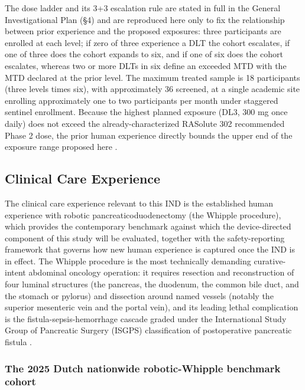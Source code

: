 The dose ladder and its 3+3 escalation rule are stated in full in the General
Investigational Plan (\S 4) and are reproduced here only to fix the relationship
between prior experience and the proposed exposures: three participants are enrolled
at each level; if zero of three experience a DLT the cohort escalates, if one of
three does the cohort expands to six, and if one of six does the cohort escalates,
whereas two or more DLTs in six define an exceeded MTD with the MTD declared at the
prior level. The maximum treated sample is 18 participants (three levels times six),
with approximately 36 screened, at a single academic site enrolling approximately
one to two participants per month under staggered sentinel enrollment. Because the
highest planned exposure (DL3, 300 mg once daily) does not exceed the
already-characterized RASolute 302 recommended Phase 2 dose, the prior human
experience directly bounds the upper end of the exposure range proposed here
\cite{daraxwhipple, phase1guidance}.

\subsection{Clinical Care Experience}

The clinical care experience relevant to this IND is the established human
experience with robotic pancreaticoduodenectomy (the Whipple procedure), which
provides the contemporary benchmark against which the device-directed component of
this study will be evaluated, together with the safety-reporting framework that
governs how new human experience is captured once the IND is in effect. The
Whipple procedure is the most technically demanding curative-intent abdominal
oncology operation: it requires resection and reconstruction of four luminal
structures (the pancreas, the duodenum, the common bile duct, and the stomach or
pylorus) and dissection around named vessels (notably the superior mesenteric vein
and the portal vein), and its leading lethal complication is the
fistula-sepsis-hemorrhage cascade graded under the International Study Group of
Pancreatic Surgery (ISGPS) classification of postoperative pancreatic fistula
\cite{onpremwhippl}.

\subsubsection*{The 2025 Dutch nationwide robotic-Whipple benchmark cohort}

